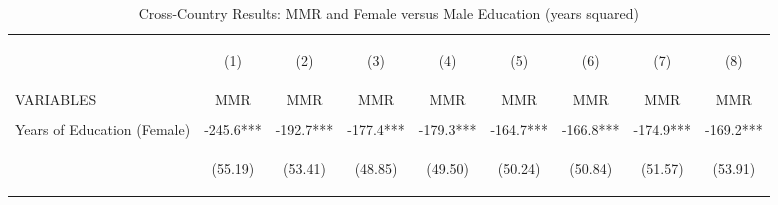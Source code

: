 \begin{landscape}\begin{table}[htpb!]\begin{center}\caption{Cross-Country Results: MMR and Female versus Male Education (years squared)}\label{MMRtab:MMRgenderSq}\begin{tabular}{lcccccccc}\toprule&\begin{footnotesize}(1)\end{footnotesize}&\begin{footnotesize}(2)\end{footnotesize}&\begin{footnotesize}(3)\end{footnotesize}&\begin{footnotesize}(4)\end{footnotesize}&\begin{footnotesize}(5)\end{footnotesize}&\begin{footnotesize}(6)\end{footnotesize}&\begin{footnotesize}(7)\end{footnotesize}&\begin{footnotesize}(8) \end{footnotesize}\\
VARIABLES&MMR&MMR&MMR&MMR&MMR&MMR&MMR&MMR\\ \midrule
&&&&&&&&\\
Years of Education (Female) &-245.6***&-192.7***&-177.4***&-179.3***&-164.7***&-166.8***&-174.9***&-169.2***\\
&\begin{footnotesize}(55.19)\end{footnotesize}&\begin{footnotesize}(53.41)\end{footnotesize}&\begin{footnotesize}(48.85)\end{footnotesize}&\begin{footnotesize}(49.50)\end{footnotesize}&\begin{footnotesize}(50.24)\end{footnotesize}&\begin{footnotesize}(50.84)\end{footnotesize}&\begin{footnotesize}(51.57)\end{footnotesize}&\begin{footnotesize}(53.91)\end{footnotesize}\\

\end{tabular}
\end{center}
\end{table}
\end{landscape}
